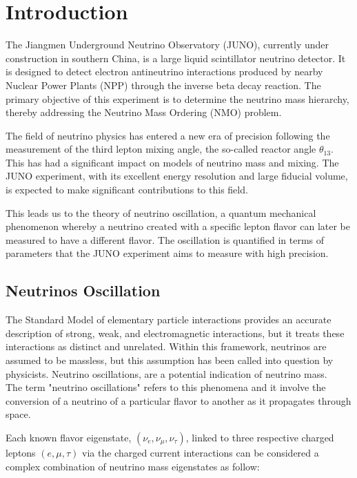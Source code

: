 \chapter{Introduction}

The Jiangmen Underground Neutrino Observatory (JUNO), currently under construction in southern China, is a large liquid scintillator neutrino detector. It is designed to detect electron antineutrino interactions produced by nearby Nuclear Power Plants (NPP) through the inverse beta decay reaction. The primary objective of this experiment is to determine the neutrino mass hierarchy, thereby addressing the Neutrino Mass Ordering (NMO) problem.

The field of neutrino physics has entered a new era of precision following the measurement of the third lepton mixing angle, the so-called reactor angle $\theta_{13}$. This has had a significant impact on models of neutrino mass and mixing. The JUNO experiment, with its excellent energy resolution and large fiducial volume, is expected to make significant contributions to this field.

This leads us to the theory of neutrino oscillation, a quantum mechanical phenomenon whereby a neutrino created with a specific lepton flavor can later be measured to have a different flavor. The oscillation is quantified in terms of parameters that the JUNO experiment aims to measure with high precision.


\section{Neutrinos Oscillation}
The Standard Model of elementary particle interactions provides an accurate description of strong, weak, and electromagnetic interactions, but it treats these interactions as distinct and unrelated. Within this framework, neutrinos are assumed to be massless, but this assumption has been called into question by physicists. Neutrino oscillations, are a potential indication of neutrino mass.\\
The term "neutrino oscillations" refers to this phenomena and it involve the conversion of a neutrino of a particular flavor to another as it propagates through space.

Each known flavor eigenstate, $(\nu_e,\nu_{\mu},\nu_{\tau})$, linked to three respective charged leptons $(e,\mu,\tau)$  via the charged current interactions can be considered a complex combination of neutrino mass eigenstates as follow:

